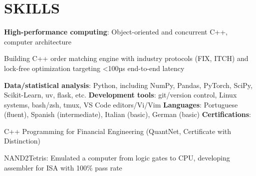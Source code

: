 \section{SKILLS}
\textbf{High-performance computing}: Object-oriented and concurrent C++, computer architecture
\begin{onecolentry}
    \begin{highlights}
        \item Building C++ order matching engine with industry protocols (FIX, ITCH) and lock-free optimization targeting <100µs end-to-end latency
    \end{highlights}
\end{onecolentry}
\textbf{Data/statistical analysis}: Python, including NumPy, Pandas, PyTorch, SciPy, Scikit-Learn, uv, flask, etc.
\textbf{Development tools}: git/version control, Linux systems, bash/zsh, tmux, VS Code editors/Vi/Vim \newline
\textbf{Languages}: Portuguese (fluent), Spanish (intermediate), Italian (basic), German (basic) \newline
\textbf{Certifications}:
\begin{onecolentry}
    \begin{highlights}
        \item C++ Programming for Financial Engineering (QuantNet, Certificate with Distinction)
        \item NAND2Tetris: Emulated a computer from logic gates to CPU, developing assembler for ISA with 100\% pass rate
    \end{highlights}
\end{onecolentry}
